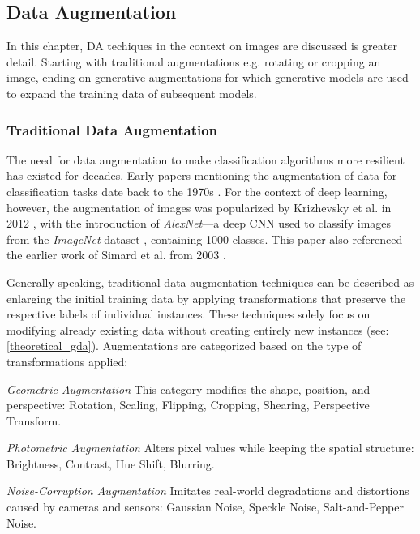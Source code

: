 \subsection[Data Augmentation - DA]{Data Augmentation}\label{theoretical_da}
In this chapter, DA techiques in the context on images are discussed is greater detail. Starting with traditional augmentations e.g. rotating or cropping an image, ending on generative augmentations for which generative models are used to expand the training data of subsequent models.

\subsubsection[Traditional Data Augmentation - TDA]{Traditional Data Augmentation}\label{theoretical_tda}
The need for data augmentation to make classification algorithms more resilient has existed for decades. Early papers mentioning the augmentation of data for classification tasks date back to the 1970s \cite{Nagy1966}. For the context of deep learning, however, the augmentation of images was popularized by Krizhevsky et al. in 2012 \cite{Krizhevsky2012traditionaldataaugmentation}, with the introduction of \textit{AlexNet}—a deep CNN used to classify images from the \textit{ImageNet} dataset \cite{ImageNetDataset5206848}, containing 1000 classes. This paper also referenced the earlier work of Simard et al. from 2003 \cite{Simard2003bestpracticesforcnns}.

Generally speaking, traditional data augmentation techniques can be described as enlarging the initial training data by applying transformations that preserve the respective labels of individual instances. These techniques solely focus on modifying already existing data without creating entirely new instances (see: \ref{theoretical_gda}). Augmentations are categorized based on the type of transformations applied:

\noindent\textit{Geometric Augmentation}
This category modifies the shape, position, and perspective: Rotation, Scaling, Flipping, Cropping, Shearing, Perspective Transform.

\noindent\textit{Photometric Augmentation}
Alters pixel values while keeping the spatial structure: Brightness, Contrast, Hue Shift, Blurring.

\noindent\textit{Noise-Corruption Augmentation}
Imitates real-world degradations and distortions caused by cameras and sensors: Gaussian Noise, Speckle Noise, Salt-and-Pepper Noise.\\

